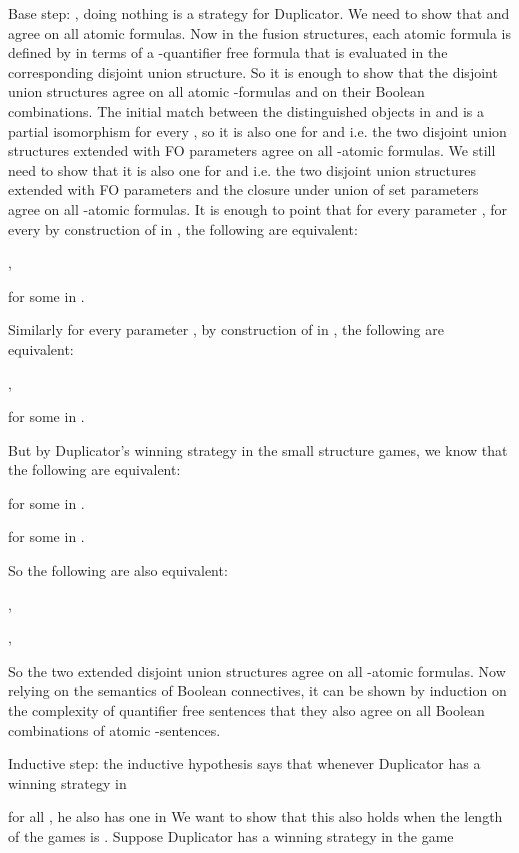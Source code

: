 \documentclass{LMCS}
\newcommand{\fo}{\textsf{FO}\xspace}
\begin{document}
Base step: , doing nothing is a strategy for Duplicator. We
need to show that  and  agree on all atomic formulas. Now in
the fusion structures, each atomic formula is defined by  in terms
of a -quantifier free formula that is evaluated in the
corresponding disjoint union structure. So it is enough to show that
the disjoint union structures agree on all atomic -formulas
and on their Boolean combinations. The initial match between the
distinguished objects in  and
 is a partial isomorphism for every
, so it is also one for  and
 i.e. the two disjoint union structures
extended with \fo parameters agree on all -atomic
formulas. We still need to show that it is also one for
 and
 i.e. the two
disjoint union structures extended with \fo parameters and the
closure under union of set parameters agree on all
-atomic formulas. It is enough to point that for every
parameter , for every  by construction of
 in , the following are equivalent:
\begin{iteMize}{}
\item ,
\item    for some  in .
\end{iteMize}
Similarly for every parameter , by construction of
 in , the following are equivalent:
\begin{iteMize}{}
\item ,
\item    for some  in .
\end{iteMize}
But by Duplicator's winning strategy in the small structure games, we
know that the following are equivalent:
\begin{iteMize}{}
\item    for some  in .
\item    for some  in .
\end{iteMize}
So the following are also equivalent:
\begin{iteMize}{}
\item ,
\item ,
\end{iteMize}
So the two extended disjoint union structures agree on all
-atomic formulas. Now relying on the semantics of
Boolean connectives, it can be shown by induction on the
complexity of quantifier free sentences that they also agree
on all Boolean combinations of atomic -sentences.

Inductive step: the inductive hypothesis says that whenever Duplicator has a
winning strategy in

for all , he also has one in
 We want to show that this also
holds when the length of the games is . Suppose Duplicator
has a winning strategy in the game
\end{document}
